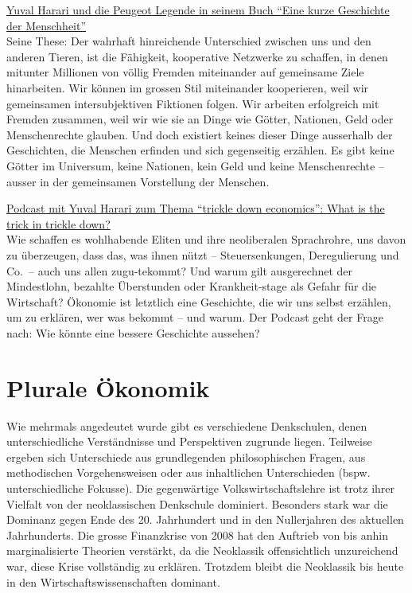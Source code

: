 \documentclass[
  nswissgerman,
  a4paper,
  DIV=11,
  numbers=noendperiod,
  oneside,
  openany]{scrreprt}
\begin{document}
\begin{tcolorbox}[enhanced jigsaw, arc=.35mm, bottomrule=.15mm, bottomtitle=1mm, breakable, colback=white, colbacktitle=quarto-callout-caution-color!10!white, colframe=quarto-callout-caution-color-frame, coltitle=black, left=2mm, leftrule=.75mm, opacityback=0, opacitybacktitle=0.6, rightrule=.15mm, title={Weiterführende Literatur}, titlerule=0mm, toprule=.15mm, toptitle=1mm]

\href{https://ilias.unibe.ch/go/file/3803488}{Yuval Harari und die
Peugeot Legende in seinem Buch ``Eine kurze Geschichte der
Menschheit''}\\
Seine These: Der wahrhaft hinreichende Unterschied zwischen uns und den
anderen Tieren, ist die Fähigkeit, kooperative Netzwerke zu schaffen, in
denen mitunter Millionen von völlig Fremden miteinander auf gemeinsame
Ziele hinarbeiten. Wir können im grossen Stil miteinander kooperieren,
weil wir gemeinsamen intersubjektiven Fiktionen folgen. Wir arbeiten
erfolgreich mit Fremden zusammen, weil wir wie sie an Dinge wie Götter,
Nationen, Geld oder Menschenrechte glauben. Und doch existiert keines
dieser Dinge ausserhalb der Geschichten, die Menschen erfinden und sich
gegenseitig erzählen. Es gibt keine Götter im Universum, keine Nationen,
kein Geld und keine Menschenrechte -- ausser in der gemeinsamen
Vorstellung der Menschen.

\href{https://pitchforkeconomics.com/episode/what-is-the-trick-in-trickle-down/}{Podcast
mit Yuval Harari zum Thema ``trickle down economics'': What is the trick
in trickle down?}\\
Wie schaffen es wohlhabende Eliten und ihre neoliberalen Sprachrohre,
uns davon zu überzeugen, dass das, was ihnen nützt -- Steuersenkungen,
Deregulierung und Co.~-- auch uns allen zugu-tekommt? Und warum gilt
ausgerechnet der Mindestlohn, bezahlte Überstunden oder Krankheit-stage
als Gefahr für die Wirtschaft? Ökonomie ist letztlich eine Geschichte,
die wir uns selbst erzählen, um zu erklären, wer was bekommt -- und
warum. Der Podcast geht der Frage nach: Wie könnte eine bessere
Geschichte aussehen?

\end{tcolorbox}

\section{Plurale Ökonomik}\label{plurale-uxf6konomik}

Wie mehrmals angedeutet wurde gibt es verschiedene Denkschulen, denen
unterschiedliche Verständnisse und Perspektiven zugrunde liegen.
Teilweise ergeben sich Unterschiede aus grundlegenden philosophischen
Fragen, aus methodischen Vorgehensweisen oder aus inhaltlichen
Unterschieden (bspw. unterschiedliche Fokusse). Die gegenwärtige
Volkswirtschaftslehre ist trotz ihrer Vielfalt von der neoklassischen
Denkschule dominiert. Besonders stark war die Dominanz gegen Ende des
20. Jahrhundert und in den Nullerjahren des aktuellen Jahrhunderts. Die
grosse Finanzkrise von 2008 hat den Auftrieb von bis anhin
marginalisierte Theorien verstärkt, da die Neoklassik offensichtlich
unzureichend war, diese Krise vollständig zu erklären. Trotzdem bleibt
die Neoklassik bis heute in den Wirtschaftswissenschaften dominant.
\end{document}

